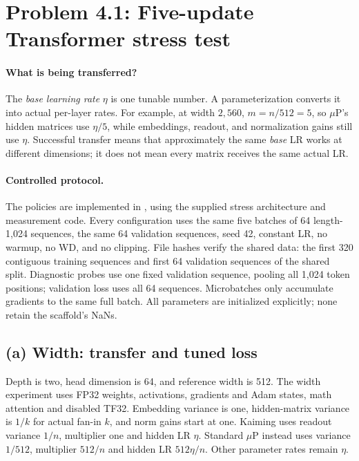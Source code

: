 \documentclass{article}
\begin{document}
\clearpage
\section{Problem 4.1: Five-update Transformer stress test}

\paragraph{What is being transferred?} The \emph{base learning rate}
$\eta$ is one tunable number. A parameterization converts it into actual
per-layer rates. For example, at width $2{,}560$, $m=n/512=5$, so
$\mu$P's hidden matrices use $\eta/5$, while embeddings, readout, and
normalization gains still use $\eta$. Successful transfer means that
approximately the same \emph{base} LR works at different dimensions;
it does not mean every matrix receives the same actual LR.

\paragraph{Controlled protocol.} The policies are implemented in
, using the supplied stress architecture
and measurement code. Every configuration uses the same five batches of 64
length-1,024 sequences, the same 64 validation sequences, seed 42,
constant LR, no warmup, no WD, and no clipping. File hashes verify the
shared data: the first 320 contiguous training sequences and first 64
validation sequences of the shared split. Diagnostic probes use one fixed validation sequence, pooling
all 1,024 token positions; validation loss uses all 64 sequences.
Microbatches only accumulate gradients to the same full batch.
All parameters are initialized explicitly; none retain the scaffold's NaNs.

\subsection{(a) Width: transfer and tuned loss}

Depth is two, head dimension is 64, and reference width is 512.
The width experiment uses FP32 weights, activations, gradients and Adam
states, math attention and disabled TF32. Embedding variance is one,
hidden-matrix variance is $1/k$ for actual fan-in $k$, and norm gains start
at one. Kaiming uses readout variance $1/n$, multiplier one and hidden LR
$\eta$. Standard $\mu$P instead uses variance $1/512$, multiplier $512/n$
and hidden LR $512\eta/n$. Other parameter rates remain $\eta$.
\end{document}
